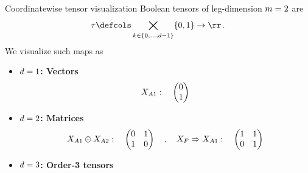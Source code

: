 \documentclass{beamer}
\begin{document}
    \begin{frame}{Coordinatewise tensor visualization}
        Boolean tensors of leg-dimension $m=2$ are
        \begin{align*}
            \hypercore \defcols \bigtimes_{\catenumerator\in\{0,\ldots,\catorder-1\}} \{0,1\} \rightarrow \rr \, .
        \end{align*}
        We visualize such maps as
        \begin{itemize}
            \item \textbf{$d=1$: Vectors}
            \begin{align*}
                X_{A1}: \quad
                \begin{pmatrix}
                    0 \\ 1
                \end{pmatrix}
            \end{align*}
            \item \textbf{$d=2$: Matrices}
            \begin{align*}
                X_{A1}\oplus X_{A2}: \quad
                \begin{pmatrix}
                    0 & 1 \\ 1 & 0
                \end{pmatrix}
                \quad, \quad
                X_{F}\Rightarrow X_{A1}: \quad
                \begin{pmatrix}
                    1 & 1 \\ 0 & 1
                \end{pmatrix}
            \end{align*}
            \item \textbf{$d=3$: Order-3 tensors}
            \begin{center}
            \end{center}
        \end{itemize}
    \end{frame}
\end{document}
